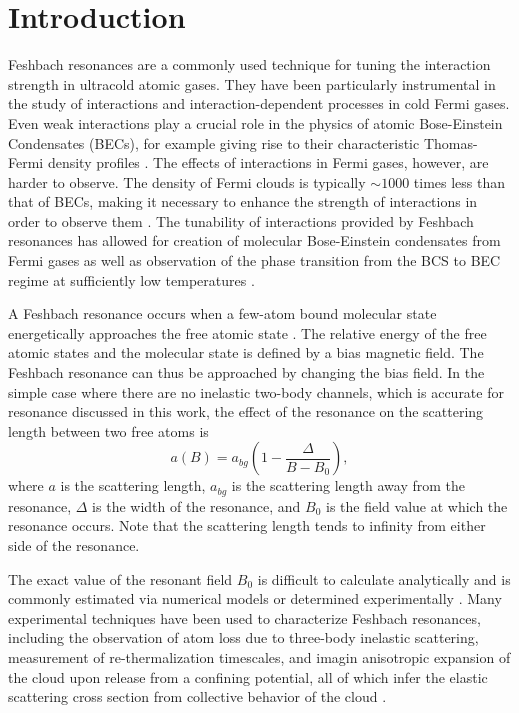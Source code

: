 \documentclass[12pt]{iopart}
\begin{document}
\section{Introduction}
Feshbach resonances are a commonly used technique for tuning the interaction strength in ultracold atomic gases. They have been particularly instrumental in the study of interactions and interaction-dependent processes in cold Fermi gases. Even weak interactions play a crucial role in the physics of atomic Bose-Einstein Condensates (BECs), for example giving rise to their characteristic Thomas-Fermi density profiles \cite{KetterleBEC}. The effects of interactions in Fermi gases, however, are harder to observe. The density of Fermi clouds is typically $\sim1000$ times less than that of BECs, making it necessary to enhance the strength of interactions in order to observe them \cite{KetterleDFG}. The tunability of interactions provided by Feshbach resonances has allowed for creation of molecular Bose-Einstein condensates from Fermi gases \cite{Greiner03,Zwierlein03, Jochim03} as well as observation of the phase transition from the BCS to BEC regime at sufficiently low temperatures \cite{Bartenstein04, Bourdel04, Zwierlein04, Regal04}. 
\par A Feshbach resonance occurs when a few-atom bound molecular state energetically approaches the free atomic state \cite{Chin10, Timmermans99}. The relative energy of the free atomic states and the molecular state is defined by a bias magnetic field. The Feshbach resonance can thus be approached by changing the bias field. In the simple case where there are no inelastic two-body channels, which is accurate for \K{} resonance discussed in this work, the effect of the resonance on the scattering length between two free atoms is \cite{Chin10}
\begin{equation}
a(B)=a_{bg}\left(1-\frac{\Delta}{B-B_0}\right),
\label{feshbachEq}
\end{equation}
where $a$ is the scattering length, $a_{bg}$ is the scattering length away from the resonance, $\Delta$ is the width of the resonance, and $B_0$ is the field value at which the resonance occurs. Note that the scattering length tends to infinity from either side of the resonance.
\par  The exact value of the resonant field $B_0$ is difficult to calculate analytically and is commonly estimated via numerical models \cite{Tiesinga93, Lysebo09, Gao11} or determined experimentally \cite{Inouye98, Cornish00}. Many experimental techniques have been used to characterize Feshbach resonances, including the observation of atom loss due to three-body inelastic scattering, measurement of re-thermalization timescales, and imagin anisotropic expansion of the cloud upon release from a confining potential, all of which infer the elastic scattering cross section from collective behavior of the cloud \cite{Regal03,OHara02,Monroe93}. 
\end{document}

